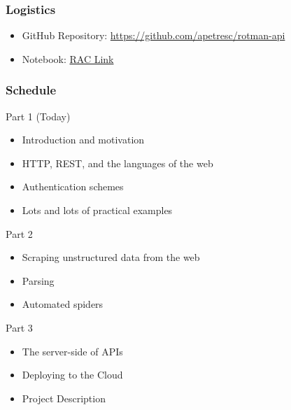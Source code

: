 \documentclass[dvipsnames]{beamer}
\begin{document}
\begin{frame}
  \frametitle{Logistics}
  
  \begin{itemize}
    \item GitHub Repository: \href{https://github.com/apetresc/rotman-api}{https://github.com/apetresc/rotman-api}
    \item Notebook: \href{https://rac.rotman.utoronto.ca/jupyter/user/ut_apetrescu/lab/tree/Day1.ipynb}{RAC Link}
  \end{itemize}
\end{frame}


\begin{frame}
  \frametitle{Schedule}
  
  \alert{Part 1 (Today)}
  \begin{itemize}
    \item Introduction and motivation
    \item HTTP, REST, and the languages of the web
    \item Authentication schemes
    \item Lots and lots of practical examples
  \end{itemize}

  Part 2
  \begin{itemize}
    \item Scraping unstructured data from the web
    \item Parsing 
    \item Automated spiders
  \end{itemize}

  Part 3
  \begin{itemize}
    \item The server-side of APIs
    \item Deploying to the Cloud
    \item Project Description
  \end{itemize}
\end{frame}
\end{document}
